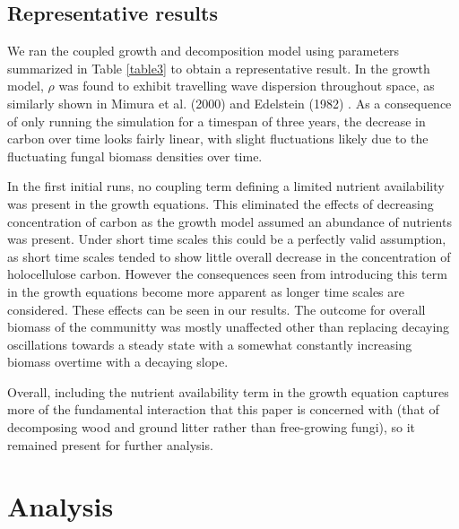 \documentclass[12pt]{article}
\begin{document}
\begin{multicols}{2}


\subsection{Representative results}
We ran the coupled growth and decomposition model using parameters summarized in Table \ref{table3} to obtain a representative result. In the growth model, $\rho$ was found to exhibit travelling wave dispersion throughout space, as similarly shown in Mimura et al. (2000) and Edelstein (1982) \cite{Mimura2000, Edelstein1982}. As a consequence of only running the simulation for a timespan of three years, the decrease in carbon over time looks fairly linear, with slight fluctuations likely due to the fluctuating fungal biomass densities over time. 

In the first initial runs, no coupling term defining a limited nutrient availability was present in the growth equations. This eliminated the effects of decreasing concentration of carbon as the growth model assumed an abundance of nutrients was present. Under short time scales this could be a perfectly valid assumption, as short time scales tended to show little overall decrease in the concentration of holocellulose carbon. However the consequences seen from introducing this term in the growth equations become more apparent as longer time scales are considered. These effects can be seen in our results. The outcome for overall biomass of the communitty was mostly unaffected other than replacing decaying oscillations towards a steady state with a somewhat constantly increasing biomass overtime with a decaying slope. 

Overall, including the nutrient availability term in the growth equation captures more of the fundamental interaction that this paper is concerned with (that of decomposing wood and ground litter rather than free-growing fungi), so it remained present for further analysis.

\section{Analysis}


\end{multicols}
\end{document}
